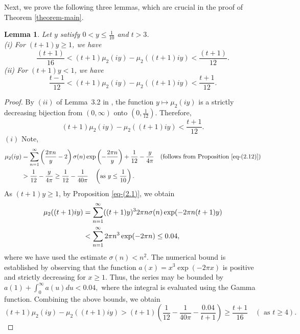 \documentclass[11pt]{amsart}
\theoremstyle{plain}
\newtheorem{lemma}[theorem]{Lemma}
\numberwithin{equation}{section}
\begin{document}
		Next, we prove the following three lemmas, which are crucial in the proof of Theorem \ref{theorem-main}.
		\begin{lemma}\label{lemma-mu2}
			Let $y$ satisfy $0<y\le \frac{1}{10}$ and $t>3$.\\
			(i) For $(t+1)y\ge1$, we have 
			\begin{equation*}
				\frac{(t+1)}{16}<(t+1)\mu_{2}(iy)-\mu_{2}((t+1)iy)<\frac{(t+1)}{12}.
			\end{equation*}   
			(ii) For $(t+1)y<1$, we have
			\begin{equation*}
				\frac{t-1}{12}<(t+1)\mu_{2}(iy)-\mu_{2}((t+1)iy)<\frac{t+1}{12}.   
			\end{equation*}
		\end{lemma}
		\begin{proof}  By $(ii)$ of Lemma~3.2 in \cite{tyler2024asymptotics}, the function $y\mapsto \mu_{2}(iy)$ is a strictly decreasing bijection from $(0,\infty)$ onto $\left(0,\tfrac{1}{12}\right)$. Therefore,
			\begin{equation}\label{eq-mu1}
				(t+1)\mu_{2}(iy)-\mu_{2}((t+1)iy)<\frac{t+1}{12}.  
			\end{equation}
			$(i)$ 
			Note,
			\begin{align*}
				\mu_{2}(iy)&=\sum_{n=1}^{\infty}\left(\frac{2\pi n}{y}-2\right)\sigma(n) \exp\left(-\frac{2\pi n}{y}\right)+\frac{1}{12}-\frac{y}{4\pi} \quad(\text{follows from Proposition \ref{eq-(2.12)})}\\
				&>\frac{1}{12}-\frac{y}{4\pi}\ge\frac{1}{12}-\frac{1}{40\pi}\quad\left(\text{as $y\le \frac{1}{10}$}\right).  
			\end{align*}
			As $(t+1)y \ge 1$, by Proposition \eqref{eq-(2.1)}, we obtain
			\begin{align}\label{eq-Numexplanation}
				\notag
				\mu_2((t+1)iy)&=\sum_{n=1}^{\infty}((t+1)y)^{3}2\pi n\sigma(n)\exp(-2\pi n(t+1)y)\\&< \sum_{n=1}^{\infty}2\pi n^{3}\exp(-2\pi n)\le 0.04, 
			\end{align}
			where we have used the estimate $\sigma(n) < n^2$. The numerical bound is established by observing that the function $a(x) = x^3 \exp(-2\pi x)$ is positive and strictly decreasing for $x \ge 1$. Thus, the series may be bounded by $a(1)+\int_{0}^{\infty}a(u)du<0.04,$ where the integral is evaluated using the Gamma function.
			\newline
			Combining the above bounds, we obtain
			\begin{equation*}
				(t+1)\mu_{2}(iy)-\mu_{2}((t+1)iy) > (t+1)\left(\frac{1}{12}-\frac{1}{40\pi}-\frac{0.04}{t+1}\right)\ge \frac{t+1}{16} \quad(\text{ as $t\ge 4$}). 

\end{equation*}
\end{proof}
\end{document}
